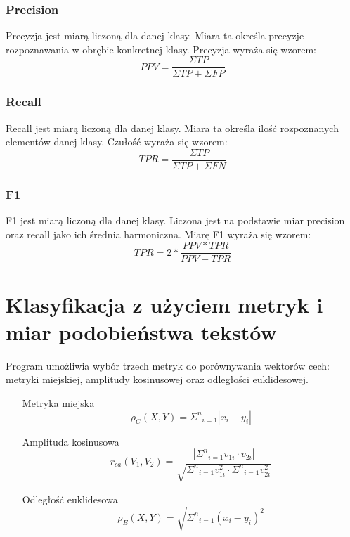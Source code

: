 \documentclass{classrep}
\begin{document}
\subsubsection{Precision}
Precyzja jest miarą liczoną dla danej klasy. Miara ta określa precyzje rozpoznawania w obrębie konkretnej klasy.
Precyzja wyraża się wzorem:
\begin{equation}
PPV=\frac{\Sigma TP}{\Sigma TP + \Sigma FP} \label{eq:eps}
\end{equation}
\subsubsection{Recall}
Recall jest miarą liczoną dla danej klasy. Miara ta określa ilość rozpoznanych elementów danej klasy.
Czułość wyraża się wzorem:
\begin{equation}
TPR=\frac{\Sigma TP}{\Sigma TP + \Sigma FN} \label{eq:eps}
\end{equation}
\subsubsection{F1}
F1 jest miarą liczoną dla danej klasy. Liczona jest na podstawie miar precision oraz recall jako ich średnia harmoniczna.
Miarę F1 wyraża się wzorem:
\begin{equation}
TPR=2*\frac{PPV*TPR}{PPV + TPR} \label{eq:eps}
\end{equation}


\section{Klasyfikacja z użyciem metryk i miar podobieństwa tekstów}
Program umożliwia wybór trzech metryk do porównywania wektorów cech: metryki miejskiej, amplitudy kosinusowej oraz odległości euklidesowej.
\begin{enumerate}
\item[Metryka miejska]{\begin{equation}
\rho_{C}(X,Y) = {{\Sigma}^{n}}_{i=1} |x_i-y_i|\label{eq:eps}
\end{equation}}
\item[Amplituda kosinusowa]{\begin{equation}
r_{ca}(V_1,V_2) = \frac{|{{\Sigma}^{n}}_{i=1} v_{1i}\cdot v_{2i}|}{\sqrt{{{\Sigma}^{n}}_{i=1} v_{1i}^2 \cdot {{\Sigma}^{n}}_{i=1} v_{2i}^2}}\label{eq:eps}
\end{equation}}
\item[Odległość euklidesowa]{\begin{equation}
\rho_{E}(X,Y) = \sqrt{{{\Sigma}^{n}}_{i=1} (x_i-y_i)^2}\label{eq:eps}
\end{equation}}
\end{enumerate}
\end{document}
